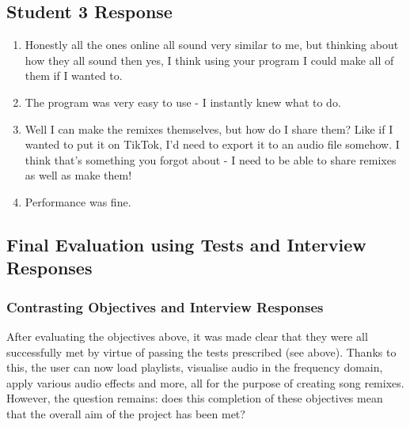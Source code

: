 \subsection{Student 3 Response}
\begin{enumerate}
	\item Honestly all the ones online all sound very similar to me, but thinking about how they all sound then yes, I think using your program I could make all of them if I wanted to.
	\item The program was very easy to use - I instantly knew what to do.
	\item Well I can make the remixes themselves, but how do I share them? Like if I wanted to put it on TikTok, I'd need to export it to an audio file somehow. I think that's something you forgot about - I need to be able to share remixes as well as make them!
	\item Performance was fine.
\end{enumerate}

\pagebreak
\subsection{Final Evaluation using Tests and Interview Responses}
\subsubsection*{Contrasting Objectives and Interview Responses}
After evaluating the objectives above, it was made clear that they were all successfully met by virtue of passing the tests prescribed (see above). Thanks to this, the user can now load playlists, visualise audio in the frequency domain, apply various audio effects and more, all for the purpose of creating song remixes. However, the question remains: does this completion of these objectives mean that the overall aim of the project has been met?

